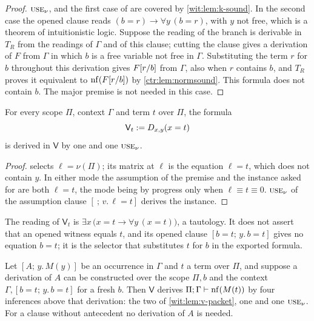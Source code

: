 \begin{proof}
$\rulename{Use}_\nu$,  and the first case of
 are covered by \cref{wit:lem:k-sound}.  In the second case
the opened clause reads $(b=r)\to\forall y\,(b=r)$, with $y$ not free, which
is a theorem of intuitionistic logic.  Suppose the reading of the branch is
derivable in $T_R$ from the readings of $\Gamma$ and of this clause; cutting
the clause gives a derivation of $F$ from
$\Gamma$ in which $b$ is a free variable not free in $\Gamma$.  Substituting
the term $r$ for $b$ throughout this derivation gives $F[r/b]$ from
$\Gamma$, also when $r$ contains $b$, and $T_R$ proves it equivalent to
$\operatorname{nf}(F[r/b])$ by \cref{ctr:lem:normsound}.  This formula does not
contain $b$.  The major premise is not needed in this case.
\end{proof}

\begin{lemma}
\label{wit:lem:v-packet}
For every scope $\Pi$, context $\Gamma$ and term $t$ over $\Pi$, the formula
\[
 \mathsf V_t\mathrel{:=}D_{x,y}(x=t)
\]
is derived in $\mathsf V$ by one  and one $\rulename{Use}_\nu$.
\end{lemma}

\begin{proof}
 selects $\ell=\nu(\Pi)$; its matrix at $\ell$ is the
equation $\ell=t$, which does not contain $y$.  In either mode the
assumption of the premise and the instance asked for are both $\ell=t$, the
mode being by progress only when $\ell\equiv t\equiv 0$.
$\rulename{Use}_\nu$ of the assumption clause $[\ ;\,v.\,\ell=t]$ derives
the instance.
\end{proof}

The reading of $\mathsf V_t$ is $\exists x\,\bigl(x=t\to\forall y\,(x=t)\bigr)$,
a tautology.  It does not assert that an opened witness equals $t$, and its
opened clause $[b=t;\,y.\,b=t]$ gives no equation $b=t$; it is the selector
that substitutes $t$ for $b$ in the exported formula.

\begin{lemma}
\label{wit:lem:v-spec}
Let $[A;\,y.\,M(y)]$ be an occurrence in $\Gamma$ and $t$ a term over $\Pi$,
and suppose a derivation of $A$ can be constructed over the scope $\Pi,b$
and the context $\Gamma,[b=t;\,y.\,b=t]$ for a fresh $b$.  Then $\mathsf V$
derives $\Pi;\Gamma\vdash\operatorname{nf}(M(t))$ by four inferences above that
derivation: the two of \cref{wit:lem:v-packet}, one  and one
$\rulename{Use}_\nu$.  For a clause without antecedent no derivation of $A$
is needed.
\end{lemma}

